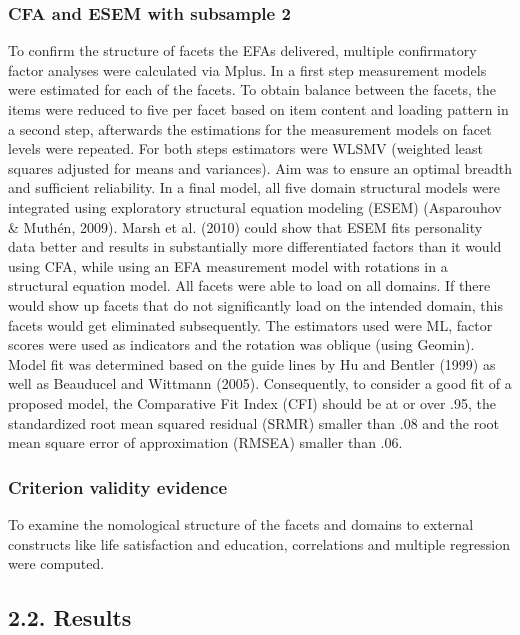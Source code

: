 \documentclass[man]{apa6}
\theoremstyle{definition}
\theoremstyle{definition}
\theoremstyle{definition}
\theoremstyle{remark}
\begin{document}
\hypertarget{cfa-and-esem-with-subsample-2}{%
\subsubsection{CFA and ESEM with subsample
2}\label{cfa-and-esem-with-subsample-2}}

To confirm the structure of facets the EFAs delivered, multiple
confirmatory factor analyses were calculated via Mplus. In a first step
measurement models were estimated for each of the facets. To obtain
balance between the facets, the items were reduced to five per facet
based on item content and loading pattern in a second step, afterwards
the estimations for the measurement models on facet levels were
repeated. For both steps estimators were WLSMV (weighted least squares
adjusted for means and variances). Aim was to ensure an optimal breadth
and sufficient reliability. In a final model, all five domain structural
models were integrated using exploratory structural equation modeling
(ESEM) (Asparouhov \& Muthén, 2009). Marsh et al. (2010) could show that
ESEM fits personality data better and results in substantially more
differentiated factors than it would using CFA, while using an EFA
measurement model with rotations in a structural equation model. All
facets were able to load on all domains. If there would show up facets
that do not significantly load on the intended domain, this facets would
get eliminated subsequently. The estimators used were ML, factor scores
were used as indicators and the rotation was oblique (using Geomin).
Model fit was determined based on the guide lines by Hu and Bentler
(1999) as well as Beauducel and Wittmann (2005). Consequently, to
consider a good fit of a proposed model, the Comparative Fit Index (CFI)
should be at or over .95, the standardized root mean squared residual
(SRMR) smaller than .08 and the root mean square error of approximation
(RMSEA) smaller than .06.

\hypertarget{criterion-validity-evidence}{%
\subsubsection{Criterion validity
evidence}\label{criterion-validity-evidence}}

To examine the nomological structure of the facets and domains to
external constructs like life satisfaction and education, correlations
and multiple regression were computed.

\hypertarget{results}{%
\subsection{2.2. Results}\label{results}}
\end{document}
